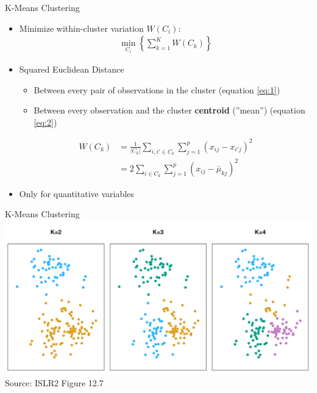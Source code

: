 \documentclass[ignorenonframetext,xcolor=x11names]{beamer}
\begin{document}
\begin{frame}{K-Means Clustering}
\begin{itemize}
  \item Minimize within-cluster variation $W(C_i)$:
\begin{align*}
\min_{C_i} \left\{ \sum_{k=1}^K W(C_k) \right\}
\end{align*}
  \item Squared Euclidean Distance
  \begin{itemize}
     \item Between every pair of observations in the cluster (equation \ref{eq:1})
     \item Between every observation and the cluster \textbf{centroid} (''mean'') (equation \ref{eq:2})
  \end{itemize}
\begin{align}
W(C_k) &= \frac{1}{|C_k|} \sum_{i,i' \in C_k} \sum_{j=1}^p (x_{ij} - x_{i'j})^2 \label{eq:1} \\
&= 2 \sum_{i \in C_k} \sum_{j=1}^p (x_{ij} - \bar{\mu}_{kj})^2 \label{eq:2}
\end{align}
  \item Only for quantitative variables
\end{itemize}
\end{frame}

\begin{frame}{K-Means Clustering}
\centering
\includegraphics[width=\textwidth]{../class11/Figures_Chapters_7-13/Chapter12/12_7.pdf} \\

\scriptsize Source: ISLR2 Figure 12.7
\end{frame}
\end{document}
